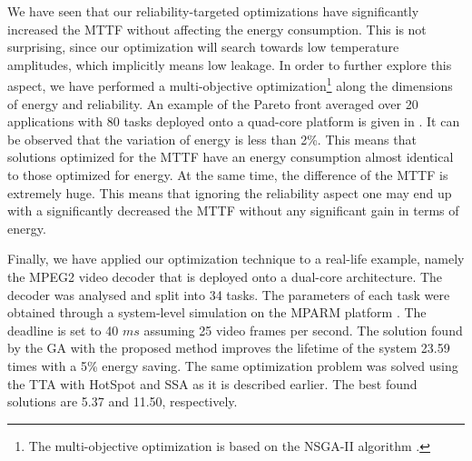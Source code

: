 We have seen that our reliability-targeted optimizations have significantly increased the MTTF without affecting the energy consumption. This is not surprising, since our optimization will search towards low temperature amplitudes, which implicitly means low leakage. In order to further explore this aspect, we have performed a multi-objective optimization\footnote{The multi-objective optimization is based on the NSGA-II algorithm \cite{deb2002}.} along the dimensions of energy and reliability. An example of the Pareto front averaged over 20 applications with 80 tasks deployed onto a quad-core platform is given in . It can be observed that the variation of energy is less than 2\%. This means that solutions optimized for the MTTF have an energy consumption almost identical to those optimized for energy. At the same time, the difference of the MTTF is extremely huge. This means that ignoring the reliability aspect one may end up with a significantly decreased the MTTF without any significant gain in terms of energy.

Finally, we have applied our optimization technique to a real-life example, namely the MPEG2 video decoder \cite{ffmpeg2011} that is deployed onto a dual-core architecture. The decoder was analysed and split into 34 tasks. The parameters of each task were obtained through a system-level simulation on the MPARM platform \cite{benini2005}. The deadline is set to 40 $ms$ assuming 25 video frames per second. The solution found by the GA with the proposed method improves the lifetime of the system 23.59 times with a 5\% energy saving. The same optimization problem was solved using the TTA with HotSpot and SSA as it is described earlier. The best found solutions are 5.37 and 11.50, respectively.
